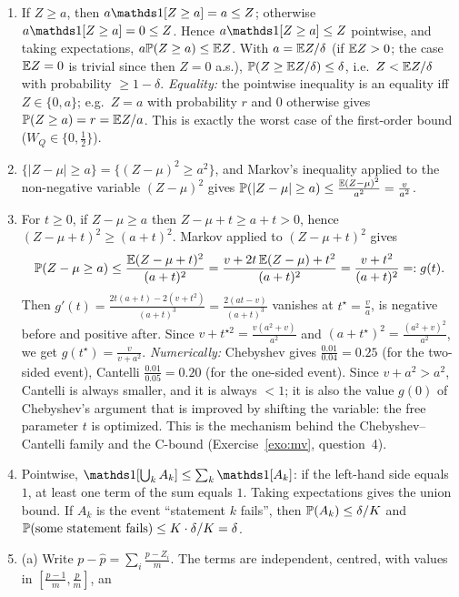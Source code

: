 \documentclass[11pt]{article}
\newcounter{exo}
\begin{document}
\begin{solution}
\begin{enumerate}
\item If $Z\geq a$, then $a\ind{Z\geq a}=a\leq Z$; otherwise $a\ind{Z\geq a}=0\leq Z$. Hence $a\ind{Z\geq a}\leq Z$ pointwise, and
      taking expectations, $a\P(Z\geq a)\leq\E Z$. With $a=\E Z/\delta$ (if $\E Z>0$; the case $\E Z=0$ is trivial since then
      $Z=0$ a.s.), $\P(Z\geq\E Z/\delta)\leq\delta$, i.e.\ $Z<\E Z/\delta$ with probability $\geq1-\delta$. \emph{Equality:} the
      pointwise inequality is an equality iff $Z\in\{0,a\}$; e.g.\ $Z=a$ with probability $r$ and $0$ otherwise gives
      $\P(Z\geq a)=r=\E Z/a$. This is exactly the worst case of the first-order bound ($W_Q\in\{0,\frac12\}$).
\item $\{|Z-\mu|\geq a\}=\{(Z-\mu)^2\geq a^2\}$, and Markov's inequality applied to the non-negative variable
      $(Z-\mu)^2$ gives $\P(|Z-\mu|\geq a)\leq\frac{\E(Z-\mu)^2}{a^2}=\frac v{a^2}$.
\item For $t\geq0$, if $Z-\mu\geq a$ then $Z-\mu+t\geq a+t>0$, hence $(Z-\mu+t)^2\geq(a+t)^2$. Markov applied to
      $(Z-\mu+t)^2$ gives
      \[\P(Z-\mu\geq a)\leq\frac{\E(Z-\mu+t)^2}{(a+t)^2}=\frac{v+2t\,\E(Z-\mu)+t^2}{(a+t)^2}=\frac{v+t^2}{(a+t)^2}=:g(t).\]
      Then $g'(t)=\frac{2t(a+t)-2(v+t^2)}{(a+t)^3}=\frac{2(at-v)}{(a+t)^3}$ vanishes at $t^\star=\frac va$, is negative before and
      positive after. Since $v+t^{\star2}=\frac{v(a^2+v)}{a^2}$ and $(a+t^\star)^2=\frac{(a^2+v)^2}{a^2}$, we get $g(t^\star)=\frac{v}{v+a^2}$.
      \emph{Numerically:} Chebyshev gives $\frac{0.01}{0.04}=0.25$ (for the two-sided event), Cantelli $\frac{0.01}{0.05}=0.20$
      (for the one-sided event). Since $v+a^2>a^2$, Cantelli is always smaller, and it is always $<1$; it is also
      the value $g(0)$ of Chebyshev's argument that is improved by shifting the variable: the free parameter $t$ is
      optimized. This is the mechanism behind the Chebyshev--Cantelli family and the C-bound (Exercise~\ref{exo:mv},
      question~4).
\item Pointwise, $\ind{\bigcup_kA_k}\leq\sum_k\ind{A_k}$: if the left-hand side equals $1$, at least one term of the
      sum equals $1$. Taking expectations gives the union bound. If $A_k$ is the event ``statement $k$ fails'', then
      $\P(A_k)\leq\delta/K$ and $\P(\text{some statement fails})\leq K\cdot\delta/K=\delta$.
\item (a) Write $p-\hat p=\sum_i\frac{p-Z_i}m$. The terms are independent, centred, with values in $[\frac{p-1}m,\frac pm]$, an

\end{enumerate}
\end{solution}
\end{document}
